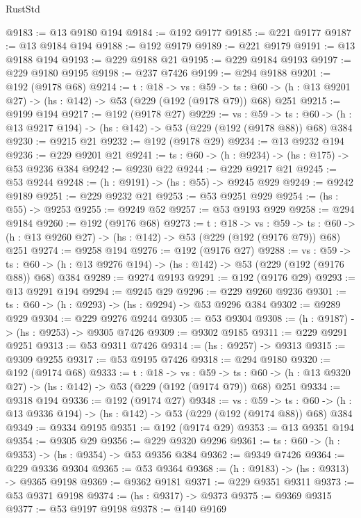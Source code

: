 \begin{lexlean}{RustStd}
\begin{coremodule}
@9183 := @13 @9180 @194
@9184 := @192 @9177
@9185 := @221 @9177
@9187 := @13 @9184 @194
@9188 := @192 @9179
@9189 := @221 @9179
@9191 := @13 @9188 @194
@9193 := @229 @9188 @21
@9195 := @229 @9184 @9193
@9197 := @229 @9180 @9195
@9198 := @237 @7426
@9199 := @294 @9188
@9201 := @192 (@9178 @68)
@9214 := {t : @18} ->
  {vs : @59} ->
  {ts : @60} -> (h : @13 @9201 @27) -> (hs : @142) -> @53 (@229 (@192 (@9178 @79)) @68) @251
@9215 := @9199 @194
@9217 := @192 (@9178 @27)
@9229 := {vs : @59} ->
  {ts : @60} -> (h : @13 @9217 @194) -> (hs : @142) -> @53 (@229 (@192 (@9178 @88)) @68) @384
@9230 := @9215 @21
@9232 := @192 (@9178 @29)
@9234 := @13 @9232 @194
@9236 := @229 @9201 @21
@9241 := {ts : @60} -> (h : @9234) -> (hs : @175) -> @53 @9236 @384
@9242 := @9230 @22
@9244 := @229 @9217 @21
@9245 := @53 @9244
@9248 := (h : @9191) -> (hs : @55) -> @9245 @929
@9249 := @9242 @9189
@9251 := @229 @9232 @21
@9253 := @53 @9251 @929
@9254 := (hs : @55) -> @9253
@9255 := @9249 @52
@9257 := @53 @9193 @929
@9258 := @294 @9184
@9260 := @192 (@9176 @68)
@9273 := {t : @18} ->
  {vs : @59} ->
  {ts : @60} -> (h : @13 @9260 @27) -> (hs : @142) -> @53 (@229 (@192 (@9176 @79)) @68) @251
@9274 := @9258 @194
@9276 := @192 (@9176 @27)
@9288 := {vs : @59} ->
  {ts : @60} -> (h : @13 @9276 @194) -> (hs : @142) -> @53 (@229 (@192 (@9176 @88)) @68) @384
@9289 := @9274 @9193
@9291 := @192 (@9176 @29)
@9293 := @13 @9291 @194
@9294 := @9245 @29
@9296 := @229 @9260 @9236
@9301 := {ts : @60} -> (h : @9293) -> (hs : @9294) -> @53 @9296 @384
@9302 := @9289 @929
@9304 := @229 @9276 @9244
@9305 := @53 @9304
@9308 := (h : @9187) -> (hs : @9253) -> @9305 @7426
@9309 := @9302 @9185
@9311 := @229 @9291 @9251
@9313 := @53 @9311 @7426
@9314 := (hs : @9257) -> @9313
@9315 := @9309 @9255
@9317 := @53 @9195 @7426
@9318 := @294 @9180
@9320 := @192 (@9174 @68)
@9333 := {t : @18} ->
  {vs : @59} ->
  {ts : @60} -> (h : @13 @9320 @27) -> (hs : @142) -> @53 (@229 (@192 (@9174 @79)) @68) @251
@9334 := @9318 @194
@9336 := @192 (@9174 @27)
@9348 := {vs : @59} ->
  {ts : @60} -> (h : @13 @9336 @194) -> (hs : @142) -> @53 (@229 (@192 (@9174 @88)) @68) @384
@9349 := @9334 @9195
@9351 := @192 (@9174 @29)
@9353 := @13 @9351 @194
@9354 := @9305 @29
@9356 := @229 @9320 @9296
@9361 := {ts : @60} -> (h : @9353) -> (hs : @9354) -> @53 @9356 @384
@9362 := @9349 @7426
@9364 := @229 @9336 @9304
@9365 := @53 @9364
@9368 := (h : @9183) -> (hs : @9313) -> @9365 @9198
@9369 := @9362 @9181
@9371 := @229 @9351 @9311
@9373 := @53 @9371 @9198
@9374 := (hs : @9317) -> @9373
@9375 := @9369 @9315
@9377 := @53 @9197 @9198
@9378 := @140 @9169

\end{coremodule}
\end{lexlean}
